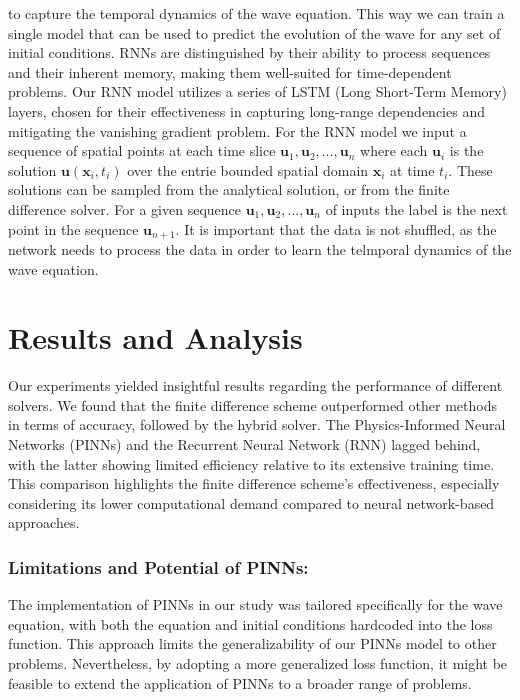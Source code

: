 \documentclass[twoside,11pt]{report}
\begin{document}
    to capture the temporal dynamics of the wave equation. This way we can train a single model that can be used
    to predict the evolution of the wave for any set of initial conditions. RNNs are distinguished by their ability to 
    process sequences and their inherent memory, making them well-suited for time-dependent problems.
    Our RNN model utilizes a series of LSTM (Long Short-Term Memory)\cite{lstm} layers, chosen for their 
    effectiveness in capturing long-range dependencies and mitigating the vanishing gradient problem.
    For the RNN model we input a sequence of spatial points at each time slice 
    $\mathbf{u}_1, \mathbf{u}_2, \dots, \mathbf{u}_n$ where each $\mathbf{u}_i$ is 
    the solution $\mathbf{u}(\mathbf{x}_i,t_i)$
    over the entrie bounded spatial domain $\mathbf{x}_i$ at time $t_i$. These solutions can be sampled from the analytical
    solution, or from the finite difference solver.
    For a given sequence $\mathbf{u}_1, \mathbf{u}_2, \dots, \mathbf{u}_n$ of inputs the 
    label is the next point in the sequence
    $\mathbf{u}_{n+1}$.
    It is important that the data is not shuffled, as the network needs to process the data in order to learn the
    telmporal dynamics of the wave equation.
        \cite{hu2022neuralpde}



\section{Results and Analysis}
\label{sec:resultsdiscussion}


    
    Our experiments yielded insightful results regarding the performance of different solvers. 
    We found that the finite difference scheme outperformed other methods in terms of accuracy, 
    followed by the hybrid solver. The Physics-Informed Neural Networks (PINNs) and the Recurrent Neural Network (RNN) 
    lagged behind, with the latter showing limited efficiency relative to its extensive training time. 
    This comparison highlights the finite difference scheme's effectiveness, especially considering its 
    lower computational demand compared to neural network-based approaches.
    \subsubsection{Limitations and Potential of PINNs:}
    The implementation of PINNs in our study was tailored specifically for the wave equation, with both the 
    equation and initial conditions hardcoded into the loss function. This approach limits the generalizability 
    of our PINNs model to other problems. Nevertheless, by adopting a more generalized loss function, it might 
    be feasible to extend the application of PINNs to a broader range of problems.
\end{document}
